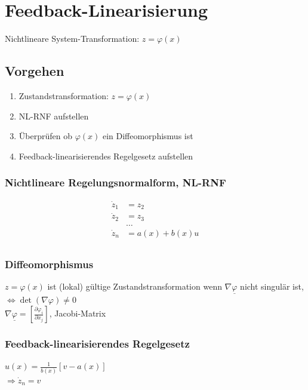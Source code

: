\documentclass[german]{latex4ei/latex4ei_sheet}
\begin{document}
\section{Feedback-Linearisierung}
\begin{sectionbox}
Nichtlineare System-Transformation: $z = \varphi (x)$

\subsection{Vorgehen}
\begin{enumerate}
  \item Zustandstransformation: $z = \varphi(x)$
  \item NL-RNF aufstellen
  \item Überprüfen ob $\varphi(x)$ ein Diffeomorphismus ist
  \item Feedback-linearisierendes Regelgesetz aufstellen
\end{enumerate}

\subsubsection{Nichtlineare Regelungsnormalform, NL-RNF}
\begin{align*}
  \dot{z}_1 &= z_2 \\
  \dot{z}_2 &= z_3 \\
            &\dots \\
  \dot{z}_n &= a(x) + b(x) u \\
\end{align*}

\subsubsection{Diffeomorphismus}
$z = \varphi(x)$ ist (lokal) gültige Zustandstransformation wenn $\nabla \underline{\varphi}$ nicht singulär ist, $\Leftrightarrow \det(\nabla \varphi) \neq 0$ \\
$\nabla \underline{\varphi} = \left[ \frac{\partial \varphi_i}{\partial x_j} \right]$, Jacobi-Matrix

\subsubsection{Feedback-linearisierendes Regelgesetz}
$u(x) = \frac{1}{b(x)}[v - a(x)]$ \\
$\Rightarrow \dot{z}_n = v $
\end{sectionbox}
\end{document}
